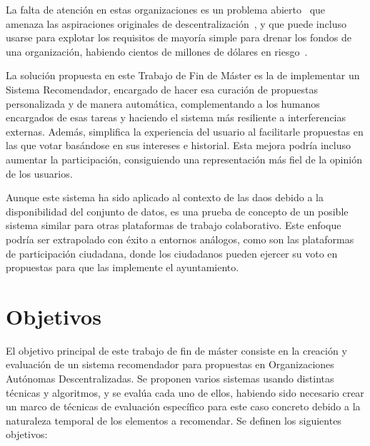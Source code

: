 La falta de atención en estas organizaciones es un problema abierto~\cite{tan_open_2023} que amenaza las aspiraciones originales de descentralización~\cite{buterin_notes_2017}, y que puede incluso usarse para explotar los requisitos de mayoría simple para drenar los fondos de una organización, habiendo cientos de millones de dólares en riesgo~\cite{patka_exploiting_2022}.

La solución propuesta en este Trabajo de Fin de Máster es la de implementar un Sistema Recomendador, encargado de hacer esa curación de propuestas personalizada y de manera automática, complementando a los humanos encargados de esas tareas y haciendo el sistema más resiliente a interferencias externas. Además, simplifica la experiencia del usuario al facilitarle propuestas en las que votar basándose en sus intereses e historial. Esta mejora podría incluso aumentar la participación, consiguiendo una representación más fiel de la opinión de los usuarios.

Aunque este sistema ha sido aplicado al contexto de las \glspl{dao} debido a la disponibilidad del conjunto de datos, es una prueba de concepto de un posible sistema similar para otras plataformas de trabajo colaborativo. Este enfoque podría ser extrapolado con éxito a entornos análogos, como son las plataformas de participación ciudadana, donde los ciudadanos pueden ejercer su voto en propuestas para que las implemente el ayuntamiento. 

\section{Objetivos}
El objetivo principal de este trabajo de fin de máster consiste en la creación y evaluación de un sistema recomendador para propuestas en Organizaciones Autónomas Descentralizadas. Se proponen varios sistemas usando distintas técnicas y algoritmos, y se evalúa cada uno de ellos, habiendo sido necesario crear un marco de técnicas de evaluación específico para este caso concreto debido a la naturaleza temporal de los elementos a recomendar. Se definen los siguientes objetivos:


